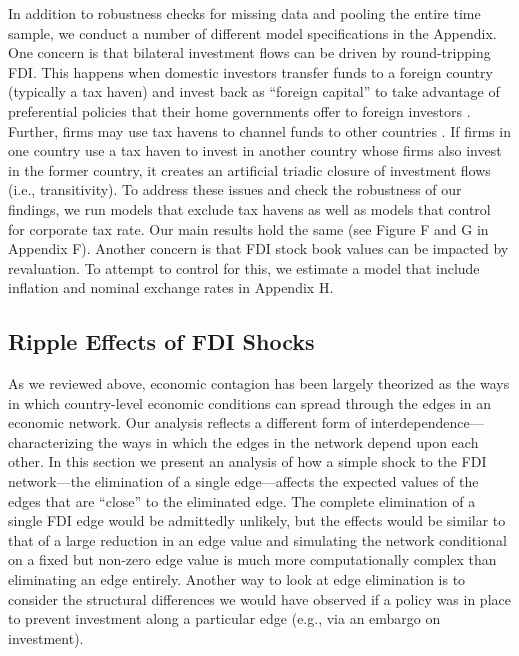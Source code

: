 \documentclass[reqno,onecolumn,letterpaper,12pt]{article}
\begin{document}
In addition to robustness checks for missing data and pooling the entire time sample, we conduct a number of different model specifications in the Appendix. One concern is that bilateral investment flows can be driven by round-tripping FDI. This happens when domestic investors transfer funds to a foreign country (typically a tax haven) and invest back as ``foreign capital'' to take advantage of preferential policies that their home governments offer to foreign investors \citep{Borga:2016}. Further, firms may use tax havens to channel funds to other countries \citep{Borga:2017}. If firms in one country use a tax haven to invest in another country whose firms also invest in the former country, it creates an artificial triadic closure of investment flows (i.e., transitivity). To address these issues and check the robustness of our findings, we run models that exclude tax havens as well as models that control for corporate tax rate. Our main results hold the same (see Figure F and G in Appendix F). Another concern is that FDI stock book values can be impacted by revaluation. To attempt to control for this, we estimate a model that include inflation and nominal exchange rates in Appendix H. 




\subsection{Ripple Effects of FDI Shocks}\label{contagion}

As we reviewed above, economic contagion has been largely theorized as the ways in which country-level economic conditions can spread through the edges in an economic network. Our analysis reflects a different form of interdependence---characterizing the ways in which the edges in the network depend upon each other. In this section we present an analysis of how a simple shock to the FDI network---the elimination of a single edge---affects the expected values of the edges that are ``close'' to the eliminated edge. The complete elimination of a single FDI edge would be admittedly unlikely, but the effects would be similar to that of a large reduction in an edge value and simulating the network conditional on a fixed but non-zero edge value is much more computationally complex than eliminating an edge entirely. Another way to look at edge elimination is to consider the structural differences we would have observed if a policy was in place to prevent investment along a particular edge (e.g., via an embargo on investment).
\end{document}
